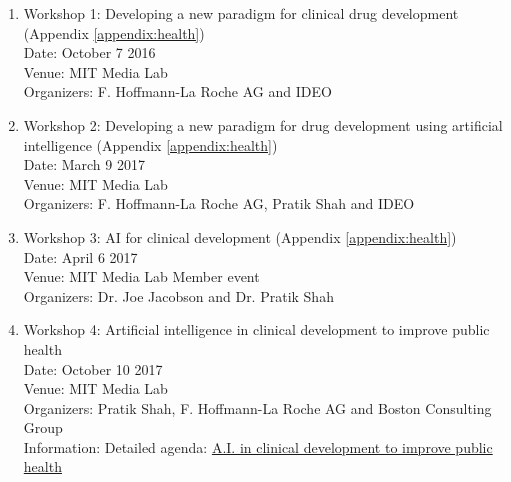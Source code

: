 \begin{enumerate}
\item Workshop 1: Developing a new paradigm for clinical drug development (Appendix \ref{appendix:health}) \\
Date: October 7 2016 \\
Venue: MIT Media Lab \\
Organizers: F. Hoffmann-La Roche AG and IDEO

\item Workshop 2: Developing a new paradigm for drug development using artificial intelligence (Appendix \ref{appendix:health}) \\
Date: March 9 2017 \\
Venue: MIT Media Lab \\
Organizers: F. Hoffmann-La Roche AG, Pratik Shah and IDEO \\

\item Workshop 3: \ac{AI} for clinical development (Appendix \ref{appendix:health}) \\
Date: April 6 2017 \\
Venue: MIT Media Lab Member event \\
Organizers: Dr. Joe Jacobson and Dr. Pratik Shah \\

\item Workshop 4: Artificial intelligence in clinical development to improve public health \\
Date: October 10 2017 \\
Venue: MIT Media Lab \\
Organizers: Pratik Shah, F. Hoffmann-La Roche AG and Boston Consulting Group \\
Information: Detailed agenda: \href{https://www.media.mit.edu/events/artificial-intelligence-in-clinical-development-to-improve-public-health/}{A.I. in clinical development to improve public health} \\
\end{enumerate}

